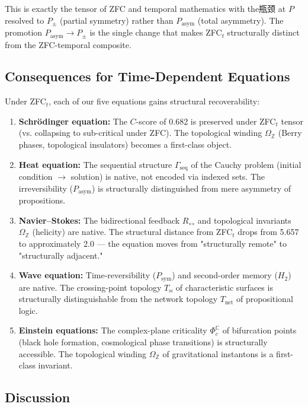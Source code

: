 \documentclass[12pt,a4paper]{article}
\begin{document}
This is exactly the tensor of ZFC and temporal mathematics with the瓶颈 at $P$ resolved to $P_{\pm}$ (partial symmetry) rather than $P_\text{asym}$ (total asymmetry). The promotion $P_\text{asym} \to P_{\pm}$ is the single change that makes ZFC$_t$ structurally distinct from the ZFC-temporal composite.

\subsection{Consequences for Time-Dependent Equations}

Under ZFC$_t$, each of our five equations gains structural recoverability:

\begin{enumerate}
    \item \textbf{Schrödinger equation:} The $C$-score of 0.682 is preserved under ZFC$_t$ tensor (vs. collapsing to sub-critical under ZFC). The topological winding $\Omega_\mathbb{Z}$ (Berry phases, topological insulators) becomes a first-class object.
    \item \textbf{Heat equation:} The sequential structure $\Gamma_\text{seq}$ of the Cauchy problem (initial condition $\to$ solution) is native, not encoded via indexed sets. The irreversibility ($P_\text{asym}$) is structurally distinguished from mere asymmetry of propositions.
    \item \textbf{Navier--Stokes:} The bidirectional feedback $R_{\leftrightarrow}$ and topological invariants $\Omega_\mathbb{Z}$ (helicity) are native. The structural distance from ZFC$_t$ drops from 5.657 to approximately 2.0 --- the equation moves from "structurally remote" to "structurally adjacent."
    \item \textbf{Wave equation:} Time-reversibility ($P_\text{sym}$) and second-order memory ($H_2$) are native. The crossing-point topology $T_{\bowtie}$ of characteristic surfaces is structurally distinguishable from the network topology $T_\text{net}$ of propositional logic.
    \item \textbf{Einstein equations:} The complex-plane criticality $\Phi_c^\mathbb{C}$ of bifurcation points (black hole formation, cosmological phase transitions) is structurally accessible. The topological winding $\Omega_\mathbb{Z}$ of gravitational instantons is a first-class invariant.
\end{enumerate}

\subsection{Discussion}
\end{document}
